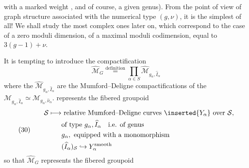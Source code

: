 with a marked weight \deleted{$\unsure{\nu}$}, \unsure{(}and of course, a given genus). From the point of view of graph structure associated with the numerical type $(g,\nu)$, it is the simplest of all! We shall study the most complex ones later on, which correspond to the case of a zero moduli dimension,  of a maximal moduli codimension, equal to $3(g-1)+\nu$.

It is tempting to introduce the compactification
\[
\widehat{\mathcal M}_G\overset{\mathrm{definition}}{=}\prod_{\alpha\in S}\widehat{\mathcal M}_{g_\alpha,\widehat I_\alpha}
\]
where the $\widehat{\mathcal M}_{g_\alpha,\widehat I_\alpha}$ are the Mumford–Deligne compactifications of the $\mathcal M_{g_\alpha,\widehat I_\alpha}\simeq\mathcal M_{g_\alpha,\widehat\nu_\alpha}$.  represents the fibered groupoid
\[
(30)\qquad\begin{aligned}
\mathcal S\longmapsto&\ \text{relative Mumford–Deligne curves }\inserted{Y_\alpha}\text{ over }\mathcal S,\\
&\text{of type }g_\alpha,\widehat I_\alpha\quad\text{i.e. of genus}\\
&g_\alpha,\text{ equipped with a monomorphism}\\
&(\widehat I_\alpha)_{\mathcal S}\hookrightarrow Y_\alpha^{\text{smooth}}
\end{aligned}
\]
so that $\widehat{\mathcal M}_G$ represents the fibered groupoid
